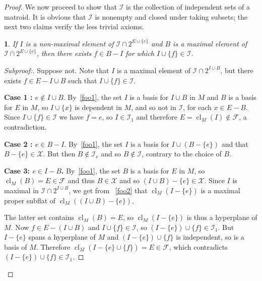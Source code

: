 \documentclass{amsart}
\theoremstyle{plain}
\newtheorem{claim}{}[theorem]
\theoremstyle{definition}
\newcommand{\cF}{\mathcal{F}}
\newcommand{\cI}{\mathcal{I}}
\newcommand{\cX}{\mathcal{X}}
\DeclareMathOperator{\cl}{cl}
\newenvironment{subproof}[1][\proofname]{%
  \renewcommand{\qedsymbol}{$\blacksquare$}%
  \begin{proof}[Subproof:]%
}{%
  \end{proof}%
}
\begin{document}
\begin{proof}
  We now proceed to show that $\cI$ is the collection of independent sets of a matroid. 
  It is obvious that $\cI$ is nonempty and closed under taking subsets; 
  the next two claims verify the less trivial axioms. 

  \begin{claim}
    If $I$ is a non-maximal element of $\cI \cap 2^{E \cup \{e\}}$ and $B$ is a maximal element of 
    $\cI \cap 2^{E \cup \{e\}}$, then there exists $f \in B - I$ for which $I \cup \{f\} \in \cI$. 
  \end{claim}
  \begin{subproof}
    
    Suppose not. Note that $I$ is a maximal element of $\cI \cap 2^{I \cup B}$, 
    but there exists $f \in E - I \cup B$ such that $I \cup \{f\} \in \cI$. 

    
    \textbf{Case 1 : $e \notin I \cup B$}. By~\ref{foo1}, the set $I$ is a basis for $I \cup B$ in $M$
    and $B$ is a basis for $E$ in $M$, so $I \cup \{x\}$ is dependent in $M$, and so not in $\cI$,
    for each $x \in E-B$. Since $I \cup \{f\} \in \cI$ we have $f = e$, so $I \in \cI_1$ 
    and therefore $E = \cl_M(I) \notin \cF$, a contradiction. 

    \textbf{Case 2 : $e \in B - I$}. 
    By~\ref{foo1}, 
    the set $I$ is a basis for $I \cup (B - \{e\})$ and that $B - \{e\} \in \cX$. 
    But then $B \notin \cI_e$ and so $B \notin \cI$, contrary to the choice of $B$. 

    \textbf{Case 3: $e \in I - B$.}
    By~\ref{foo1}, the set $B$ is a basis for $E$ in $M$, so $\cl_M(B) = E \in \cF$ and thus $B \in \cX$ and so $(I \cup B) - \{e\} \in \cX$. Since $I$ is maximal in $\cI \cap 2^{I \cup B}$, 
    we get from ~\ref{foo2} that $\cl_M(I - \{e\})$ is a maximal proper subflat of $\cl_M((I \cup B)- \{e\})$. 
    
    The latter set contains $\cl_M(B) = E$, so $\cl_M(I - \{e\})$ is thus a hyperplane of $M$.
    Now $f \in E - (I \cup B)$ and $I \cup \{f\} \in \cI$, so $(I - \{e\}) \cup \{f\} \in \cI_1$. 
    But $I - \{e\}$ spans a hyperplane of $M$ and $(I - \{e\}) \cup \{f\}$ is independent, 
    so is a basis of $M$. Therefore $\cl_M(I - \{e\} \cup \{f\}) = E \in \cF$, 
    which contradicts $(I - \{e\}) \cup \{f\} \in \cI_1$. 


\end{subproof}
\end{proof}
\end{document}
